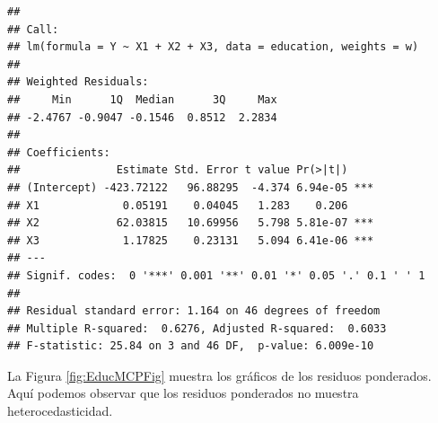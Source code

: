 \documentclass[
]{article}
\newenvironment{Shaded}{\begin{snugshade}}{\end{snugshade}}
\newcommand{\AttributeTok}[1]{\textcolor[rgb]{0.13,0.29,0.53}{#1}}
\newcommand{\DecValTok}[1]{\textcolor[rgb]{0.00,0.00,0.81}{#1}}
\newcommand{\FunctionTok}[1]{\textcolor[rgb]{0.13,0.29,0.53}{\textbf{#1}}}
\newcommand{\NormalTok}[1]{#1}
\newcommand{\OtherTok}[1]{\textcolor[rgb]{0.56,0.35,0.01}{#1}}
\newcommand{\SpecialCharTok}[1]{\textcolor[rgb]{0.81,0.36,0.00}{\textbf{#1}}}
\newcommand{\StringTok}[1]{\textcolor[rgb]{0.31,0.60,0.02}{#1}}
\begin{document}
\begin{verbatim}
## 
## Call:
## lm(formula = Y ~ X1 + X2 + X3, data = education, weights = w)
## 
## Weighted Residuals:
##     Min      1Q  Median      3Q     Max 
## -2.4767 -0.9047 -0.1546  0.8512  2.2834 
## 
## Coefficients:
##               Estimate Std. Error t value Pr(>|t|)    
## (Intercept) -423.72122   96.88295  -4.374 6.94e-05 ***
## X1             0.05191    0.04045   1.283    0.206    
## X2            62.03815   10.69956   5.798 5.81e-07 ***
## X3             1.17825    0.23131   5.094 6.41e-06 ***
## ---
## Signif. codes:  0 '***' 0.001 '**' 0.01 '*' 0.05 '.' 0.1 ' ' 1
## 
## Residual standard error: 1.164 on 46 degrees of freedom
## Multiple R-squared:  0.6276, Adjusted R-squared:  0.6033 
## F-statistic: 25.84 on 3 and 46 DF,  p-value: 6.009e-10
\end{verbatim}

La Figura \ref{fig:EducMCPFig} muestra los gráficos de los residuos ponderados. Aquí podemos observar que los residuos ponderados no muestra heterocedasticidad.

\begin{Shaded}
\end{Shaded}
\end{document}
